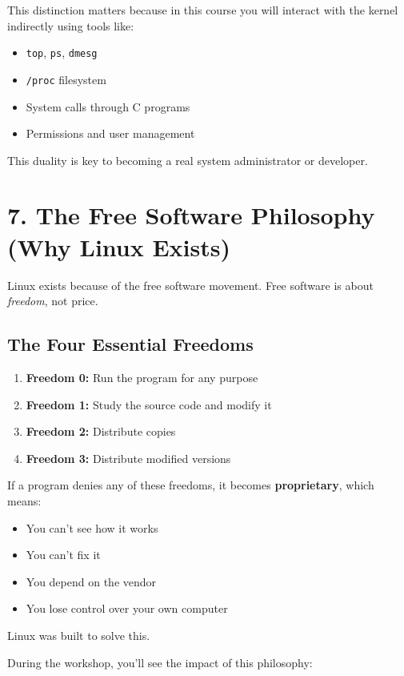 \documentclass[12pt]{article}
\begin{document}
This distinction matters because in this course you will interact with the kernel indirectly using tools like:

\begin{itemize}
    \item \texttt{top}, \texttt{ps}, \texttt{dmesg}
    \item \texttt{/proc} filesystem
    \item System calls through C programs
    \item Permissions and user management
\end{itemize}

This duality is key to becoming a real system administrator or developer.

\section*{7. The Free Software Philosophy (Why Linux Exists)}

Linux exists because of the free software movement. Free software is about \textit{freedom}, not price.

\subsection*{The Four Essential Freedoms}
\begin{enumerate}
    \item \textbf{Freedom 0:} Run the program for any purpose
    \item \textbf{Freedom 1:} Study the source code and modify it
    \item \textbf{Freedom 2:} Distribute copies
    \item \textbf{Freedom 3:} Distribute modified versions
\end{enumerate}

If a program denies any of these freedoms, it becomes \textbf{proprietary}, which means:

\begin{itemize}
    \item You can't see how it works
    \item You can't fix it
    \item You depend on the vendor
    \item You lose control over your own computer
\end{itemize}

Linux was built to solve this.

During the workshop, you'll see the impact of this philosophy:
\end{document}
